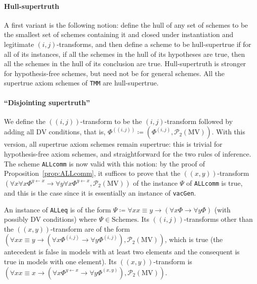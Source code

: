 \documentclass[11pt]{article}
\newcommand{\pp}[2]{(\!( #1 , #2 )\!)}
\newcommand*{\calP}{\mathcal{P}}
\newcommand*{\MV}{\mathrm{MV}}
\newcommand*{\Schemes}{\mathrm{Schemes}}
\theoremstyle{plain}
\theoremstyle{definition}
\theoremstyle{remark}
\begin{document}
\paragraph{Hull-supertruth}

A first variant is the following notion: define the hull of any set of schemes to be the smallest
set of schemes containing it and closed under instantiation and legitimate $(i, j)$-transforms,
and then define a scheme to be hull-supertrue if for all of its instances, if all the schemes in
the hull of its hypotheses are true, then all the schemes in the hull of its conclusion are true.
Hull-supertruth is stronger for hypothesis-free schemes, but need not be for general schemes.
All the supertrue axiom schemes of \texttt{TMM} are hull-supertrue.



\paragraph{``Disjointing supertruth''}

We define the $\pp{i}{j}$-transform to be the $(i, j)$-transform followed by adding all DV conditions,
that is, $\Phi^{\pp{i}{j}} \coloneqq (\Phi^{(i, j)}, \calP_2(\MV))$.
With this version, all supertrue axiom schemes remain supertrue: this is trivial for hypothesis-free
axiom schemes, and straightforward for the two rules of inference.
The scheme \texttt{ALLcomm} is now valid with this notion: by the proof of
Proposition~\ref{prop:ALLcomm}, it suffices to prove that the $\pp{x}{y}$-transform
$(\forall x \forall x \Phi^{y \leftarrow x} \to \forall y \forall x \Phi^{y \leftarrow x}, \calP_2(\MV))$
of the instance $\Psi$ of \texttt{ALLcomm} is true, and this is the case since it is essentially an
instance of \texttt{vacGen}.

An instance of \texttt{ALLeq} is of the form
$\Psi \coloneqq \forall x x \equiv y \to (\forall x \Phi \to \forall y \Phi)$ (with possibly DV conditions)
where $\Psi \in \Schemes$.
Its $\pp{i}{j}$-transforms other than the $\pp{x}{y}$-transform are of the form
$(\forall x x \equiv y \to (\forall x \Phi^{(i, j)} \to \forall y \Phi^{(i, j)}), \calP_2(\MV))$,
which is true (the antecedent is false in models with at least two elements and the
consequent is true in models with one element).
Its $\pp{x}{y}$-transform is
$(\forall x x \equiv x \to (\forall x \Phi^{y \leftarrow x} \to \forall y \Phi^{(x,y)}), \calP_2(\MV))$.
\end{document}
